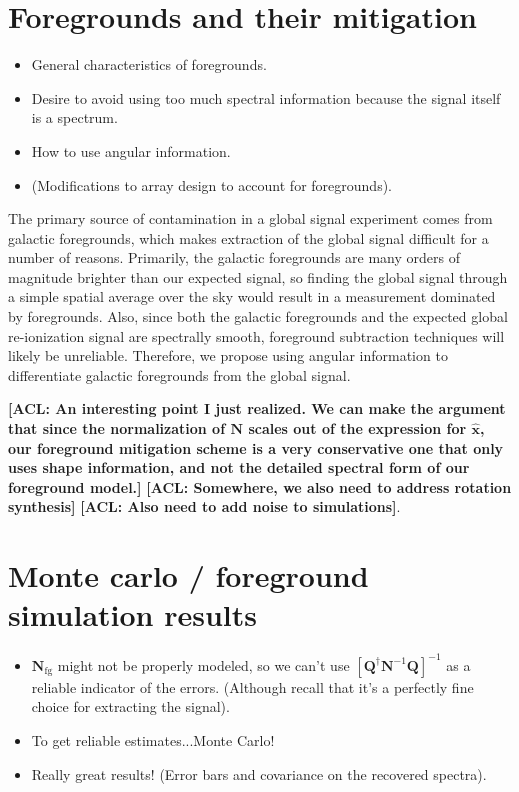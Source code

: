 \documentclass[twolcolumn,apj]{emulateapj}
\newcommand{\acl}[1]{{\color{red} \textbf{[ACL:  #1]}}}
\begin{document}
\section{Foregrounds and their mitigation}
\begin{itemize}
\item General characteristics of foregrounds.
\item Desire to avoid using too much spectral information because the signal itself is a spectrum.
\item How to use angular information.
\item (Modifications to array design to account for foregrounds).
\end{itemize}

The primary source of contamination in a global signal experiment comes from galactic foregrounds, which makes extraction of the global signal difficult for a number of reasons. Primarily, the galactic foregrounds are many orders of magnitude brighter than our expected signal, so finding the global signal through a simple spatial average over the sky would result in a measurement dominated by foregrounds. Also, since both the galactic foregrounds and the expected global re-ionization signal are spectrally smooth, foreground subtraction techniques will likely be unreliable. Therefore, we propose using angular information to differentiate galactic foregrounds from the global signal. 

\acl{An interesting point I just realized.  We can make the argument that since the normalization of $\mathbf{N}$ scales out of the expression for $\hat{\mathbf{x}}$, our foreground mitigation scheme is a very conservative one that only uses shape information, and not the detailed spectral form of our foreground model.}
\acl{Somewhere, we also need to address rotation synthesis}
\acl{Also need to add noise to simulations}.

\section{Monte carlo / foreground simulation results}
\begin{itemize}
\item $\mathbf{N}_\textrm{fg}$ might not be properly modeled, so we can't use $[\mathbf{Q}^\dagger \mathbf{N}^{-1} \mathbf{Q}]^{-1}$ as a reliable indicator of the errors.  (Although recall that it's a perfectly fine choice for extracting the signal).
\item To get reliable estimates...Monte Carlo!
\item Really great results! (Error bars and covariance on the recovered spectra).
\end{itemize}
\end{document}
